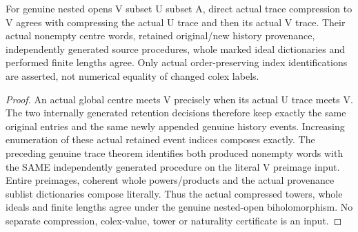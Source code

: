 \begin{theorem}
\label{hir:nc-ordered-open-trace-nested-history}
\leanok
{}
For genuine nested opens V subset U subset A, direct actual trace compression
to V agrees with compressing the actual U trace and then its actual V trace.
Their actual nonempty centre words, retained original/new history provenance,
independently generated source procedures, whole marked ideal dictionaries
and performed finite lengths agree. Only actual order-preserving index
identifications are asserted, not numerical equality of changed colex labels.
\end{theorem}
\begin{proof}
An actual global centre meets V precisely when its actual U trace meets V.
The two internally generated retention decisions therefore keep exactly the
same original entries and the same newly appended genuine history events.
Increasing enumeration of these actual retained event indices composes exactly.
The preceding genuine trace theorem identifies both produced nonempty words
with the SAME independently generated procedure on the literal V preimage input.
Entire preimages, coherent whole powers/products and the actual provenance
sublist dictionaries compose literally. Thus the actual compressed towers,
whole ideals and finite lengths agree under the genuine nested-open
biholomorphism. No separate compression, colex-value, tower or naturality
certificate is an input.
\end{proof}

